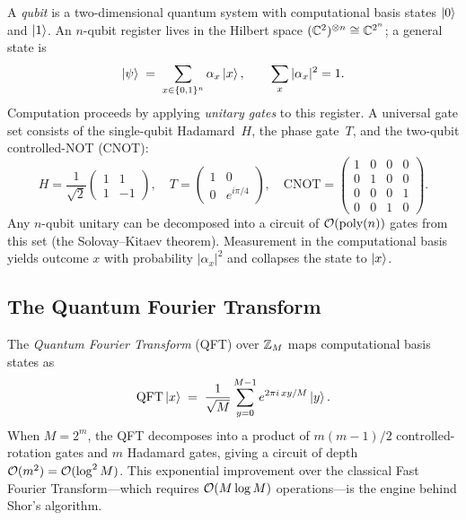 A \emph{qubit} is a two-dimensional quantum system with computational basis states $\ket{0}$ and $\ket{1}$.  An $n$-qubit register lives in the Hilbert space $(\mathbb{C}^2)^{\otimes n} \cong \mathbb{C}^{2^n}$; a general state is
\begin{equation}
\label{eq:n-qubit-state}
\ket{\psi} \;=\; \sum_{x \in \{0,1\}^n} \alpha_x \ket{x}, \qquad \sum_{x} |\alpha_x|^2 = 1.
\end{equation}
Computation proceeds by applying \emph{unitary gates} to this register.  A universal gate set consists of the single-qubit Hadamard~$H$, the phase gate~$T$, and the two-qubit controlled-NOT (CNOT):
\begin{equation}
\label{eq:gates}
H = \frac{1}{\sqrt{2}}\begin{pmatrix}1&1\\1&-1\end{pmatrix}, \quad
T = \begin{pmatrix}1&0\\0&e^{i\pi/4}\end{pmatrix}, \quad
\text{CNOT} = \begin{pmatrix}1&0&0&0\\0&1&0&0\\0&0&0&1\\0&0&1&0\end{pmatrix}.
\end{equation}
Any $n$-qubit unitary can be decomposed into a circuit of $\mathcal{O}(\text{poly}(n))$ gates from this set (the Solovay--Kitaev theorem).  Measurement in the computational basis yields outcome $x$ with probability $|\alpha_x|^2$ and collapses the state to $\ket{x}$.


\subsection{The Quantum Fourier Transform}
\label{subsec:qft}

The \emph{Quantum Fourier Transform} (QFT) over $\mathbb{Z}_M$ maps computational basis states as
\begin{equation}
\label{eq:qft-def}
\text{QFT}\ket{x} \;=\; \frac{1}{\sqrt{M}} \sum_{y=0}^{M-1} e^{2\pi i\, xy/M}\ket{y}.
\end{equation}
When $M = 2^m$, the QFT decomposes into a product of $m(m-1)/2$ controlled-rotation gates and $m$ Hadamard gates, giving a circuit of depth $\mathcal{O}(m^2) = \mathcal{O}(\log^2 M)$.  This exponential improvement over the classical Fast Fourier Transform---which requires $\mathcal{O}(M\log M)$ operations---is the engine behind Shor's algorithm.


